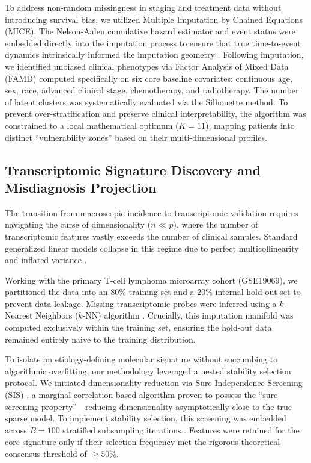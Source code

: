 \documentclass[a4paper,11pt,twocolumn]{article}
\begin{document}
	To address non-random missingness in staging and treatment data without introducing survival bias, we utilized Multiple Imputation by Chained Equations (MICE). The Nelson-Aalen cumulative hazard estimator and event status were embedded directly into the imputation process to ensure that true time-to-event dynamics intrinsically informed the imputation geometry \cite{White2009}. Following imputation, we identified unbiased clinical phenotypes via Factor Analysis of Mixed Data (FAMD) computed specifically on six core baseline covariates: continuous age, sex, race, advanced clinical stage, chemotherapy, and radiotherapy. The number of latent clusters was systematically evaluated via the Silhouette method. To prevent over-stratification and preserve clinical interpretability, the algorithm was constrained to a local mathematical optimum ($K=11$), mapping patients into distinct ``vulnerability zones'' based on their multi-dimensional profiles.
	
	\subsection{Transcriptomic Signature Discovery and Misdiagnosis Projection}
	The transition from macroscopic incidence to transcriptomic validation requires navigating the curse of dimensionality ($n \ll p$), where the number of transcriptomic features vastly exceeds the number of clinical samples. Standard generalized linear models collapse in this regime due to perfect multicollinearity and inflated variance \cite{Hastie2015}.
	
	Working with the primary T-cell lymphoma microarray cohort (GSE19069), we partitioned the data into an 80\% training set and a 20\% internal hold-out set to prevent data leakage. Missing transcriptomic probes were inferred using a $k$-Nearest Neighbors ($k$-NN) algorithm \cite{Troyanskaya2001}. Crucially, this imputation manifold was computed exclusively within the training set, ensuring the hold-out data remained entirely naive to the training distribution.
	
	To isolate an etiology-defining molecular signature without succumbing to algorithmic overfitting, our methodology leveraged a nested stability selection protocol. We initiated dimensionality reduction via Sure Independence Screening (SIS) \cite{Fan2008}, a marginal correlation-based algorithm proven to possess the ``sure screening property''—reducing dimensionality asymptotically close to the true sparse model. To implement stability selection, this screening was embedded across $B=100$ stratified subsampling iterations \cite{Meinshausen2010}. Features were retained for the core signature only if their selection frequency met the rigorous theoretical consensus threshold of $\ge 50\%$.
	
\end{document}
